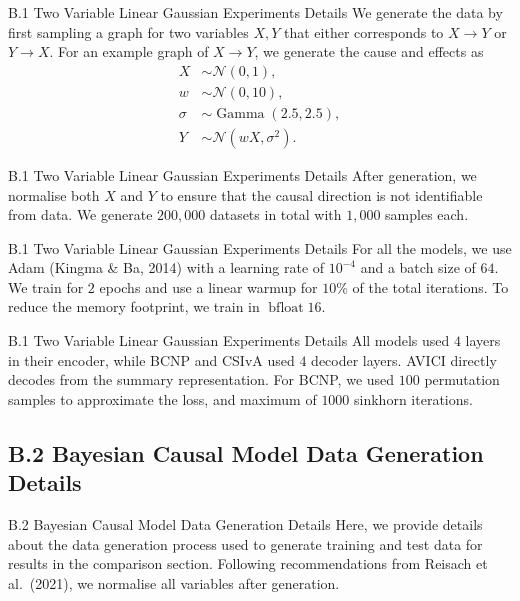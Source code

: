 \documentclass[aspectratio=169,10pt]{beamer}
\begin{document}
\begin{frame}{B.1 Two Variable Linear Gaussian Experiments Details}
We generate the data by first sampling a graph for two variables $X,Y$ that either corresponds to $X \to Y$ or $Y \to X$. For an example graph of $X \to Y$, we generate the cause and effects as
\begin{align*}
    X &\sim \mathcal{N}(0,1), \\
    w &\sim \mathcal{N}(0, 10), \\
    \sigma &\sim \operatorname{Gamma}(2.5, 2.5), \\
    Y &\sim \mathcal{N}(wX, \sigma^2).
\end{align*}
\end{frame}

\begin{frame}{B.1 Two Variable Linear Gaussian Experiments Details}
After generation, we normalise both $X$ and $Y$ to ensure that the causal direction is not identifiable from data. We generate $200,000$ datasets in total with $1,000$ samples each.
\end{frame}

\begin{frame}{B.1 Two Variable Linear Gaussian Experiments Details}
\small
For all the models, we use Adam (Kingma \& Ba, 2014) with a learning rate of $10^{-4}$ and a batch size of $64$. We train for $2$ epochs and use a linear warmup for $10\%$ of the total iterations. To reduce the memory footprint, we train in $\operatorname{bfloat}16$.
\end{frame}

\begin{frame}{B.1 Two Variable Linear Gaussian Experiments Details}
All models used $4$ layers in their encoder, while BCNP and CSIvA used $4$ decoder layers. AVICI directly decodes from the summary representation. For BCNP, we used $100$ permutation samples to approximate the loss, and maximum of $1000$ sinkhorn iterations.
\end{frame}

\subsection{B.2 Bayesian Causal Model Data Generation Details}

\begin{frame}{B.2 Bayesian Causal Model Data Generation Details}
\small
Here, we provide details about the data generation process used to generate training and test data for results in the comparison section. Following recommendations from Reisach et al.\ (2021), we normalise all variables after generation.
\end{frame}
\end{document}
